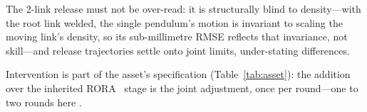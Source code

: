 The 2-link release must not be over-read: it is structurally blind to
density---with the root link welded, the single pendulum's motion is
invariant to scaling the moving link's density, so its sub-millimetre RMSE
reflects that invariance, not skill---and release trajectories
settle onto joint limits, under-stating differences.

Intervention is part of the asset's specification (Table~\ref{tab:asset}):
the addition over the inherited RORA~\cite{lee2026rora} stage is the joint
adjustment, once per round---one to two rounds here .


